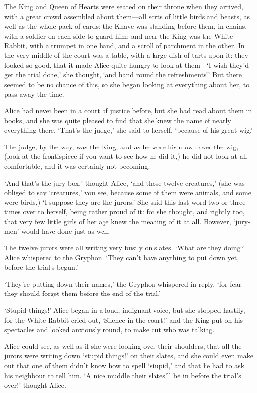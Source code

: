 \documentclass[12pt,openany]{memoir}
\begin{document}
The King and Queen of Hearts were seated on their throne when they arrived, with a great crowd assembled about them---all sorts of little birds and beasts, as well as the whole pack of cards: the Knave was standing before them, in chains, with a soldier on each side to guard him; and near the King was the White Rabbit, with a trumpet in one hand, and a scroll of parchment in the other. In the very middle of the court was a table, with a large dish of tarts upon it: they looked so good, that it made Alice quite hungry to look at them---`I wish they'd get the trial done,' she thought, `and hand round the refreshments!' But there seemed to be no chance of this, so she began looking at everything about her, to pass away the time.

Alice had never been in a court of justice before, but she had read about them in books, and she was quite pleased to find that she knew the name of nearly everything there. `That's the judge,' she said to herself, `because of his great wig.'

The judge, by the way, was the King; and as he wore his crown over the wig, (look at the frontispiece if you want to see how he did it,) he did not look at all comfortable, and it was certainly not becoming.

`And that's the jury-box,' thought Alice, `and those twelve creatures,' (she was obliged to say `creatures,' you see, because some of them were animals, and some were birds,) `I suppose they are the jurors.' She said this last word two or three times over to herself, being rather proud of it: for she thought, and rightly too, that very few little girls of her age knew the meaning of it at all. However, `jury-men' would have done just as well.

The twelve jurors were all writing very busily on slates. `What are they doing?' Alice whispered to the Gryphon. `They can't have anything to put down yet, before the trial's begun.'

`They're putting down their names,' the Gryphon whispered in reply, `for fear they should forget them before the end of the trial.'

`Stupid things!' Alice began in a loud, indignant voice, but she stopped hastily, for the White Rabbit cried out, `Silence in the court!' and the King put on his spectacles and looked anxiously round, to make out who was talking.

Alice could see, as well as if she were looking over their shoulders, that all the jurors were writing down `stupid things!' on their slates, and she could even make out that one of them didn't know how to spell `stupid,' and that he had to ask his neighbour to tell him. `A nice muddle their slates'll be in before the trial's over!' thought Alice.
\end{document}
